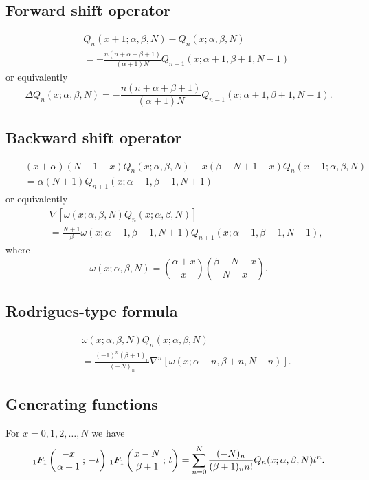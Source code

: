 \documentclass[envcountchap,graybox]{svmono}
\newcommand{\hyp}[5]{\mbox{}_{#1}{F}_{#2}
\left(\genfrac{}{}{0pt}{}{#3}{#4}\,;\,#5\right)}
\begin{document}
\subsection*{Forward shift operator}
\begin{eqnarray}
\label{shift1HahnI}
& &Q_n(x+1;\alpha,\beta,N)-Q_n(x;\alpha,\beta,N)\nonumber\\
& &{}=-\frac{n(n+\alpha+\beta+1)}{(\alpha+1)N}Q_{n-1}(x;\alpha+1,\beta+1,N-1)
\end{eqnarray}
or equivalently
\begin{equation}
\label{shift1HahnII}
\Delta Q_n(x;\alpha,\beta,N)=-\frac{n(n+\alpha+\beta+1)}{(\alpha+1)N}Q_{n-1}(x;\alpha+1,\beta+1,N-1).
\end{equation}

\subsection*{Backward shift operator}
\begin{eqnarray}
\label{shift2HahnI}
& &(x+\alpha)(N+1-x)Q_n(x;\alpha,\beta,N)-x(\beta+N+1-x)Q_n(x-1;\alpha,\beta,N)\nonumber\\
& &{}=\alpha(N+1)Q_{n+1}(x;\alpha-1,\beta-1,N+1)
\end{eqnarray}
or equivalently
\begin{eqnarray}
\label{shift2HahnII}
& &\nabla\left[\omega(x;\alpha,\beta,N)Q_n(x;\alpha,\beta,N)\right]\nonumber\\
& &{}=\frac{N+1}{\beta}\omega(x;\alpha-1,\beta-1,N+1)Q_{n+1}(x;\alpha-1,\beta-1,N+1),
\end{eqnarray}
where
$$\omega(x;\alpha,\beta,N)=\binom{\alpha+x}{x}\binom{\beta+N-x}{N-x}.$$

\subsection*{Rodrigues-type formula}
\begin{eqnarray}
\label{RodHahn}
& &\omega(x;\alpha,\beta,N)Q_n(x;\alpha,\beta,N)\nonumber\\
& &{}=\frac{(-1)^n(\beta+1)_n}{(-N)_n}\nabla^n\left[\omega(x;\alpha+n,\beta+n,N-n)\right].
\end{eqnarray}

\subsection*{Generating functions}
For $x=0,1,2,\ldots,N$ we have
\begin{equation}
\label{GenHahn1}
\hyp{1}{1}{-x}{\alpha+1}{-t}\,\hyp{1}{1}{x-N}{\beta+1}{t}
=\sum_{n=0}^N\frac{(-N)_n}{(\beta+1)_nn!}Q_n(x;\alpha,\beta,N)t^n.
\end{equation}
\end{document}
